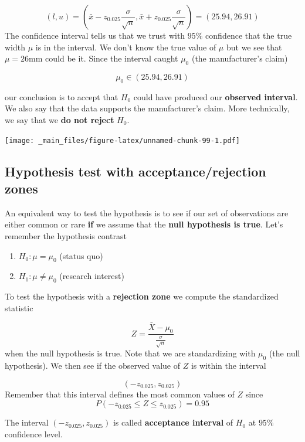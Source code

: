 \documentclass[
]{book}
\providecommand{\tightlist}{%
  \setlength{\itemsep}{0pt}\setlength{\parskip}{0pt}}
\begin{document}
\[(l,u)=(\bar{x}-z_{0.025} \frac{\sigma}{\sqrt{n}}, \bar{x}+z_{0.025} \frac{\sigma}{\sqrt{n}})= (25.94, 26.91)\]
The confidence interval tells us that we trust with \(95\%\) confidence that the true width \(\mu\) is in the interval. We don't know the true value of \(\mu\) but we see that \(\mu=26\)mm could be it. Since the interval caught \(\mu_0\) (the manufacturer's claim)

\[\mu_0\in (25.94, 26.91)\]

our conclusion is to accept that \(H_0\) could have produced our \textbf{observed interval}. We also say that the data supports the manufacturer's claim. More technically, we say that we \textbf{do not reject} \(H_0\).

\texttt{[image: \_main\_files/figure-latex/unnamed-chunk-99-1.pdf]}

\hypertarget{hypothesis-test-with-acceptancerejection-zones}{%
\subsection{Hypothesis test with acceptance/rejection zones}\label{hypothesis-test-with-acceptancerejection-zones}}

An equivalent way to test the hypothesis is to see if our set of observations are either common or rare \textbf{if} we assume that the \textbf{null hypothesis is true}. Let's remember the hypothesis contrast

\begin{enumerate}
\def\labelenumi{\alph{enumi}.}
\tightlist
\item
  \(H_0:\mu = \mu_0\) (status quo)
\item
  \(H_1:\mu \neq \mu_0\) (research interest)
\end{enumerate}

To test the hypothesis with a \textbf{rejection zone} we compute the standardized statistic

\[Z=\frac{\bar{X}-\mu_0}{\frac{\sigma}{\sqrt{n}}}\]
when the null hypothesis is true. Note that we are standardizing with \(\mu_0\) (the null hypothesis). We then see if the observed value of \(Z\) is within the interval

\[(-z_{0.025}, z_{0.025})\]
Remember that this interval defines the most common values of \(Z\) since \[P(-z_{0.025} \leq Z \leq z_{0.025})=0.95\]

The interval \((-z_{0.025}, z_{0.025})\) is called \textbf{acceptance interval} of \(H_0\) at \(95\%\) confidence level.
\end{document}
